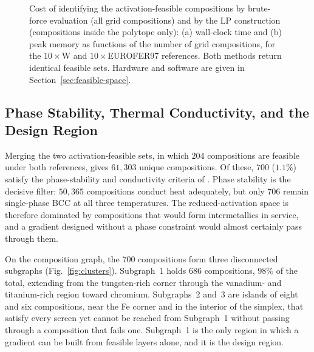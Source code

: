\begin{figure}[H]
  \centering
  \caption{Cost of identifying the activation-feasible compositions by brute-force
  evaluation (all grid compositions) and by the LP construction (compositions inside
  the polytope only): (a) wall-clock time and (b) peak memory as functions of the
  number of grid compositions, for the \(10\times\)W and \(10\times\)EUROFER97
  references. Both methods return identical feasible sets. Hardware and software are
  given in Section~\ref{sec:feasible-space}.}
  \label{fig:benchmark}
\end{figure}


\subsection{Phase Stability, Thermal Conductivity, and the Design Region}
\label{subsec:subgraphs}

Merging the two activation-feasible sets, in which \(204\) compositions are feasible
under both references, gives \(61{,}303\) unique compositions. Of these, \(700\)
(\(1.1\%\)) satisfy the phase-stability and conductivity criteria of
. Phase stability is the decisive filter: \(50{,}365\) compositions
conduct heat adequately, but only \(706\) remain single-phase BCC at all three
temperatures. The reduced-activation space is therefore dominated by compositions
that would form intermetallics in service, and a gradient designed without a phase
constraint would almost certainly pass through them.

On the composition graph, the \(700\) compositions form three disconnected subgraphs
(Fig.~\ref{fig:clusters}). Subgraph~1 holds \(686\) compositions, \(98\%\) of the
total, extending from the tungsten-rich corner through the vanadium- and
titanium-rich region toward chromium. Subgraphs~2 and~3 are islands of eight and six
compositions, near the Fe corner and in the interior of the simplex, that satisfy
every screen yet cannot be reached from Subgraph~1 without passing through a
composition that fails one. Subgraph~1 is the only region in which a gradient can be
built from feasible layers alone, and it is the design region.

